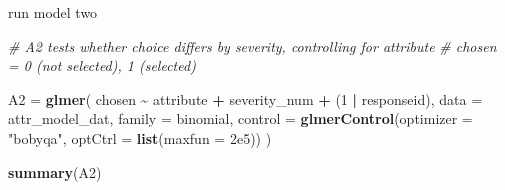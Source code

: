 \documentclass[
]{article}
\newenvironment{Shaded}{\begin{snugshade}}{\end{snugshade}}
\newcommand{\AttributeTok}[1]{\textcolor[rgb]{0.13,0.29,0.53}{#1}}
\newcommand{\CommentTok}[1]{\textcolor[rgb]{0.56,0.35,0.01}{\textit{#1}}}
\newcommand{\DecValTok}[1]{\textcolor[rgb]{0.00,0.00,0.81}{#1}}
\newcommand{\FloatTok}[1]{\textcolor[rgb]{0.00,0.00,0.81}{#1}}
\newcommand{\FunctionTok}[1]{\textcolor[rgb]{0.13,0.29,0.53}{\textbf{#1}}}
\newcommand{\NormalTok}[1]{#1}
\newcommand{\OtherTok}[1]{\textcolor[rgb]{0.56,0.35,0.01}{#1}}
\newcommand{\SpecialCharTok}[1]{\textcolor[rgb]{0.81,0.36,0.00}{\textbf{#1}}}
\newcommand{\StringTok}[1]{\textcolor[rgb]{0.31,0.60,0.02}{#1}}
\begin{document}
run model two

\begin{Shaded}
\begin{Highlighting}[]
\CommentTok{\# A2 tests whether choice differs by severity, controlling for attribute}
\CommentTok{\# chosen = 0 (not selected), 1 (selected)}

\NormalTok{A2 }\OtherTok{=} \FunctionTok{glmer}\NormalTok{(}
\NormalTok{  chosen }\SpecialCharTok{\textasciitilde{}}\NormalTok{ attribute }\SpecialCharTok{+}\NormalTok{ severity\_num }\SpecialCharTok{+}
\NormalTok{    (}\DecValTok{1} \SpecialCharTok{|}\NormalTok{ responseid),}
  \AttributeTok{data =}\NormalTok{ attr\_model\_dat,}
  \AttributeTok{family =}\NormalTok{ binomial,}
  \AttributeTok{control =} \FunctionTok{glmerControl}\NormalTok{(}\AttributeTok{optimizer =} \StringTok{"bobyqa"}\NormalTok{, }\AttributeTok{optCtrl =} \FunctionTok{list}\NormalTok{(}\AttributeTok{maxfun =} \FloatTok{2e5}\NormalTok{))}
\NormalTok{)}

\FunctionTok{summary}\NormalTok{(A2)}
\end{Highlighting}
\end{Shaded}
\end{document}
